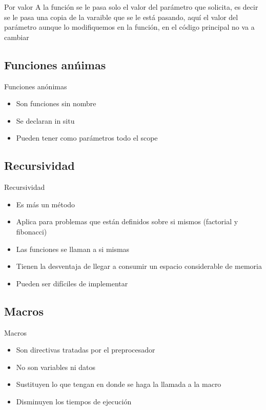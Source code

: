 \documentclass{beamer}
\begin{document}
\begin{frame}{Por valor}
	A la funci\'on se le pasa solo el valor del par\'ametro que solicita, es decir se le pasa una copia de la varaible que se le est\'a pasando, aqu\'i el valor del par\'ametro aunque lo modifiquemos en la funci\'on, en el c\'odigo principal no va a cambiar
\end{frame}

\subsection{Funciones an\'nimas}

\begin{frame}{Funciones an\'onimas}
	\begin{itemize}
		\item Son funciones sin nombre
		\item Se declaran in situ
		\item Pueden tener como par\'ametros todo el scope
	\end{itemize}
\end{frame}

\subsection{Recursividad}

\begin{frame}{Recursividad}
	\begin{itemize}
		\item Es m\'as un m\'etodo
		\item Aplica para problemas que est\'an definidos sobre si mismos (factorial y fibonacci)
		\item Las funciones se llaman a si mismas
		\item Tienen la desventaja de llegar a consumir un espacio considerable de memoria
		\item Pueden ser dif\'iciles de implementar
	\end{itemize}
	\centering
\end{frame}

\subsection{Macros}
\begin{frame}{Macros}
	\begin{itemize}
		\item Son directivas tratadas por el preprocesador
		\item No son variables ni datos
		\item Sustituyen lo que tengan en donde se haga la llamada a la macro
		\item Disminuyen los tiempos de ejecuci\'on
	\end{itemize}
\end{frame}
\end{document}
